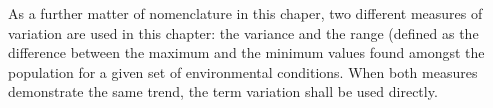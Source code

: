 \documentclass[../thesis-main.tex]{subfiles}
\begin{document}
As a further matter of nomenclature in this chaper, two different measures of variation are used in this chapter: the variance and the range (defined as the difference between the maximum and the minimum values found amongst the population for a given set of environmental conditions. When both measures demonstrate the same trend, the term variation shall be used directly.



\end{document}
